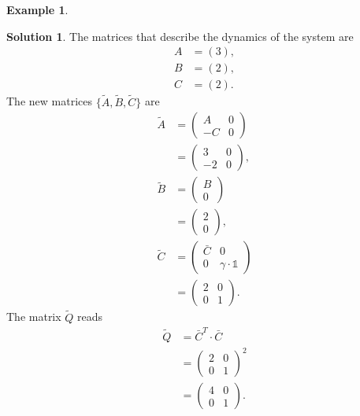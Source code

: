 \documentclass[a4paper,12 pt]{article}
\numberwithin{equation}{section}
\theoremstyle{definition}
\newtheorem{bsp}{Example}
\theoremstyle{remark}
\theoremstyle{definition}
\newtheorem*{lsg}{Solution}
\theoremstyle{definition}
\theoremstyle{definition}
\theoremstyle{remark}
\begin{document}
\begin{bsp}
\begin{lsg}
The matrices that describe the dynamics of the system are
\begin{equation*}
\begin{split}
A&=(3),\\
B&=(2),\\
C&=(2).
\end{split}
\end{equation*}
The new matrices $\{\tilde{A},\tilde{B},\tilde{C} \}$ are
\begin{equation*}
\begin{split}
\tilde{A}&=\begin{pmatrix} A&0\\-C&0 \end{pmatrix}\\
&=\begin{pmatrix} 3&0\\-2&0\end{pmatrix},\\
\tilde{B}&=\begin{pmatrix} B\\ 0 \end{pmatrix}\\
&=\begin{pmatrix} 2\\ 0\end{pmatrix},\\
\tilde{C}&=\begin{pmatrix} \bar{C}&0 \\ 0&\gamma \cdot \mathbb{1} \end{pmatrix} \\
&=\begin{pmatrix} 2&0\\ 0&1 \end{pmatrix}.
\end{split}
\end{equation*}
The matrix $\tilde{Q}$ reads
\begin{equation*}
\begin{split}
\tilde{Q}&=\bar{C}^T\cdot \bar{C}\\
&=\begin{pmatrix} 2&0\\ 0&1 \end{pmatrix}^2\\
&=\begin{pmatrix} 4&0\\ 0&1 \end{pmatrix}.
\end{split}
\end{equation*}

\end{lsg}
\end{bsp}
\end{document}
